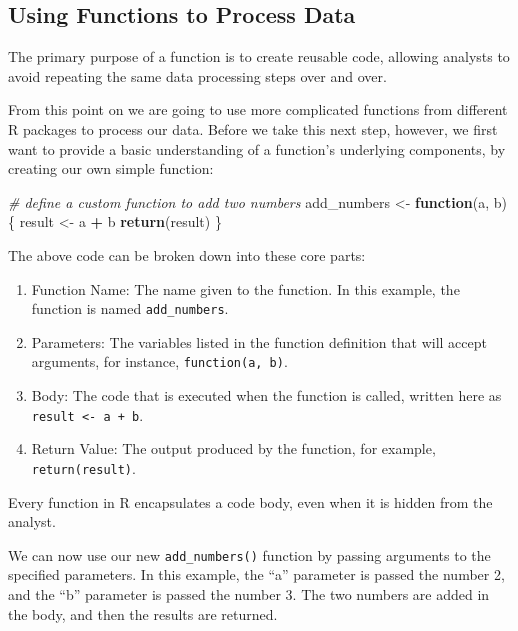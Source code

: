 \documentclass[
]{article}
\newenvironment{Shaded}{\begin{snugshade}}{\end{snugshade}}
\newcommand{\CommentTok}[1]{\textcolor[rgb]{0.56,0.35,0.01}{\textit{#1}}}
\newcommand{\ControlFlowTok}[1]{\textcolor[rgb]{0.13,0.29,0.53}{\textbf{#1}}}
\newcommand{\FunctionTok}[1]{\textcolor[rgb]{0.13,0.29,0.53}{\textbf{#1}}}
\newcommand{\NormalTok}[1]{#1}
\newcommand{\OtherTok}[1]{\textcolor[rgb]{0.56,0.35,0.01}{#1}}
\newcommand{\SpecialCharTok}[1]{\textcolor[rgb]{0.81,0.36,0.00}{\textbf{#1}}}
\providecommand{\tightlist}{%
  \setlength{\itemsep}{0pt}\setlength{\parskip}{0pt}}
\begin{document}
\subsection{Using Functions to Process
Data}\label{using-functions-to-process-data}

The primary purpose of a function is to create reusable code, allowing
analysts to avoid repeating the same data processing steps over and
over.

From this point on we are going to use more complicated functions from
different R packages to process our data. Before we take this next step,
however, we first want to provide a basic understanding of a function's
underlying components, by creating our own simple function:

\begin{Shaded}
\begin{Highlighting}[]
\CommentTok{\# define a custom function to add two numbers}
\NormalTok{add\_numbers }\OtherTok{\textless{}{-}} \ControlFlowTok{function}\NormalTok{(a, b) \{ }
\NormalTok{  result }\OtherTok{\textless{}{-}}\NormalTok{ a }\SpecialCharTok{+}\NormalTok{ b }
  \FunctionTok{return}\NormalTok{(result) \}}
\end{Highlighting}
\end{Shaded}

The above code can be broken down into these core parts:

\begin{enumerate}
\def\labelenumi{\arabic{enumi}.}
\tightlist
\item
  Function Name: The name given to the function. In this example, the
  function is named \texttt{add\_numbers}.
\item
  Parameters: The variables listed in the function definition that will
  accept arguments, for instance, \texttt{function(a,\ b)}.
\item
  Body: The code that is executed when the function is called, written
  here as \texttt{result\ \textless{}-\ a\ +\ b}.
\item
  Return Value: The output produced by the function, for example,
  \texttt{return(result)}.
\end{enumerate}

Every function in R encapsulates a code body, even when it is hidden
from the analyst.

We can now use our new \texttt{add\_numbers()} function by passing
arguments to the specified parameters. In this example, the ``a''
parameter is passed the number 2, and the ``b'' parameter is passed the
number 3. The two numbers are added in the body, and then the results
are returned.
\end{document}

